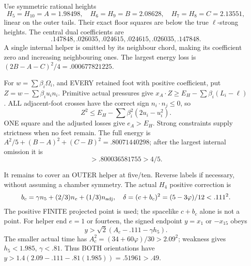 \documentclass[11pt]{article}
\begin{document}
Use symmetric rational heights
\[
 H_5=H_{10}=A=1.98498,\quad
 H_6=H_9=B=2.08628,\quad
 H_7=H_8=C=2.13551,
\]
linear on the outer tails.
Their exact floor squares are below the true
\(\ell\)-strong heights.
The central dual coefficients are
\[
                  .147848,.026035,.024615,
                  .024615,.026035,.147848 .
\]
A single internal helper is omitted by its
neighbour chord, making its coefficient zero
and increasing neighbouring ones.
The largest energy loss is
\((2B-A-C)^2/4=.000677821225\).

For \(w=\sum\beta_i\Omega_i\), and EVERY retained
foot with positive coefficient, put
\(Z=w-\sum\beta_i u_i n_i\).
Primitive actual pressures give
\(x_A\cdot Z\ge E_H-\sum\beta_i(L_i-\ell)\).
ALL adjacent-foot crosses have the correct sign
\(n_i\cdot n_j\le0\), so
\[
 Z^2\le E_H-\sum\beta_i^2(2u_i-u_i^2).
\]
ONE square and the adjusted losses give \(e_A>E_H\).
Strong constraints supply strictness when no
feet remain.
The full energy is
\(A^2/5+(B-A)^2+(C-B)^2=.80071440298\);
after the largest internal omission it is
\[
                              >.800036581755>4/5 .
\]

It remains to cover an OUTER helper at five/ten.
Reverse labels if necessary, without assuming
a chamber symmetry.
The actual \(H_4\) positive correction is
\[
 b_c=\gamma n_5+(2/3)n_e+(1/3)n_{\rm adj},\quad
 \delta=(c+b_c)^2=(5-3\varphi)/12<.111^2 .
\]
The positive FINITE projected point is used;
the spacelike \(c+b_c\) alone is not a point.
For helper end \(e=1\) or fourteen, the signed
endpoint \(y=x_1\) or \(-x_{15}\) obeys
\[
                    y>\sqrt2(A_c-.111-\gamma h_5).
\]
The smaller actual time has
\(A_c^2=(34+60\varphi)/30>2.09^2\);
weakness gives \(h_5<1.985\), \(\gamma<.81\).
Thus BOTH orientations have
\(y>1.4(2.09-.111-.81(1.985))=.51961>.49\).
\end{document}
